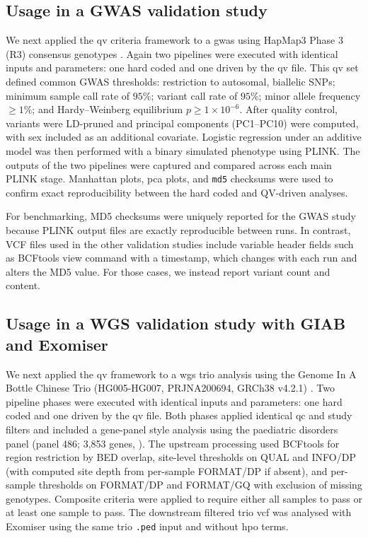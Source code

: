 \subsection{Usage in a GWAS validation study}
We next applied the \ac{qv} criteria framework to a \ac{gwas} using HapMap3 Phase 3 (R3) consensus genotypes \cite{2020fairleyInternationalGenomeSample}. Again
two pipelines were executed with identical inputs and parameters: one hard coded and one driven by the \ac{qv}  file.
This \ac{qv}  set defined common GWAS thresholds: restriction to autosomal, biallelic SNPs; minimum sample call rate of $95\%$; variant call rate of $95\%$; minor allele frequency $\geq 1\%$; and Hardy–Weinberg equilibrium $p \geq 1\times10^{-6}$. After quality control, variants were LD-pruned and principal components (PC1–PC10) were computed, with sex included as an additional covariate. Logistic regression under an additive model was then performed with a binary simulated phenotype using PLINK.
The outputs of the two pipelines were captured and compared across each main PLINK stage. Manhattan plots, \ac{pca} plots, and \texttt{md5} checksums were used to confirm exact reproducibility between the hard coded and QV-driven analyses.

For benchmarking, MD5 checksums were uniquely reported for the GWAS study because PLINK output files are exactly reproducible between runs. In contrast, VCF files used in the other validation studies include variable header fields such as BCFtools view command with a timestamp, which changes with each run and alters the MD5 value. For those cases, we instead report variant count and content.

\subsection{Usage in a WGS validation study with GIAB and Exomiser}
We next applied the \ac{qv} framework to a \ac{wgs} trio analysis using the Genome In A Bottle Chinese Trio (HG005-HG007, PRJNA200694, GRCh38 v4.2.1) \cite{2022wagnerBenchmarkingChallengingSmall}. 
Two pipeline phases were executed with identical inputs and parameters: one hard coded and one driven by the \ac{qv} file.
Both phases applied identical \ac{qc} and study filters and included a gene-panel style analysis using the paediatric disorders panel (panel 486; 3{,}853 genes, \cite{lawless_panelapprex_2025}). 
The upstream processing used BCFtools for region restriction by BED overlap, site-level thresholds on QUAL and INFO/DP (with computed site depth from per-sample FORMAT/DP if absent), and per-sample thresholds on FORMAT/DP and FORMAT/GQ with exclusion of missing genotypes. 
Composite criteria were applied to require either all samples to pass or at least one sample to pass. 
The downstream filtered trio \ac{vcf} was analysed with Exomiser using the same trio \texttt{.ped} input and without \ac{hpo} terms.


